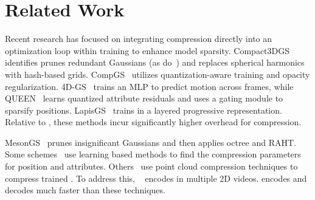 \section{Related Work}\label{sec:related-work}
%

Recent research has focused on integrating compression directly into an optimization loop within training to enhance model sparsity.
%
Compact3DGS~\cite{compact3dgs} identifies prunes redundant Gaussians (as do~\cite{recongs2025, scaffoldgs}) and replaces spherical harmonics with hash-based grids.
%
CompGS~\cite{compgs} utilizes quantization-aware training and opacity regularization.
%
4D-GS~\cite{4dgs} trains an MLP to predict motion across frames, while QUEEN~\cite{queen} learns quantized attribute residuals and uses a gating module to sparsify positions. 
%
%
LapisGS~\cite{shi2025lapisgs} trains \gs{} in a layered progressive representation.
%
Relative to \gsnfs{}, these methods incur significantly higher overhead for compression.

%
MesonGS~\cite{mesongs} prunes insignificant Gaussians and then applies octree and RAHT.
%
Some schemes~\cite{gauspcgc, entropygs} use learning based methods to find the compression parameters for position and attributes.
%
Others~\cite{LTS, gpcc-adaptive} use point cloud compression techniques to compress trained \gs{}.
%
%
To address this, \vthree{}~\cite{v3volumetric} encodes \dgs{} in multiple 2D videos.
%
\gsnfs{} encodes and decodes much faster than these techniques.
%
